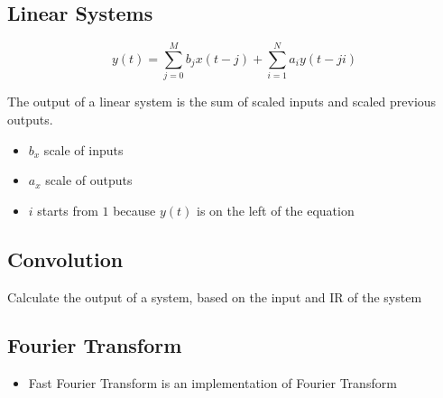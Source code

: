   \subsection{Linear Systems}

    \begin{equation}
      y\left( t \right) =
        \sum_{j = 0}^{M} b_{j} x\left( t - j \right)
        + \sum_{i = 1}^{N} a_{i} y\left( t - ji \right)
    \end{equation}

    The output of a linear system is the sum of scaled inputs and
    scaled previous outputs.

    \begin{itemize}
      \item $ b_{x} $ scale of inputs
      \item $ a_{x} $ scale of outputs
      \item $ i $ starts from $ 1 $ because $ y\left( t \right) $ is on the left
      of the equation
    \end{itemize}

  \subsection{Convolution}

    Calculate the output of a system, based on the input and IR of the system

  \subsection{Fourier Transform}

    \begin{itemize}
      \item Fast Fourier Transform is an implementation of Fourier Transform
    \end{itemize}
